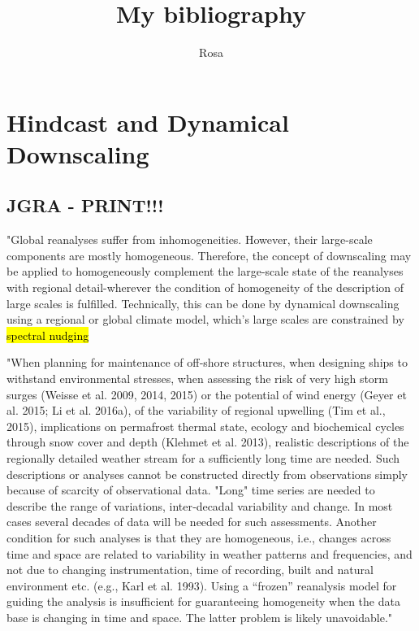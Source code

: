 \documentclass[12pt,a4paper]{article}
\title{My bibliography}
\author{Rosa}
\begin{document}
\maketitle
\tableofcontents

\section{Hindcast and Dynamical Downscaling }

\subsection{\cite{VonStorch2017} JGRA - PRINT!!!}

"Global reanalyses suffer from inhomogeneities. However, their large-scale components are mostly homogeneous. Therefore, the concept of downscaling may be applied to homogeneously complement the large-scale state of the reanalyses with regional detail-wherever the condition of homogeneity of the description of large scales is fulfilled. Technically, this can be done by dynamical downscaling using a regional or global climate model, which's large scales are constrained by \hl{spectral nudging}

"When planning for maintenance of off‐shore structures, when designing ships to withstand environmental stresses, when assessing the risk of very high storm surges (Weisse et al. 2009, 2014, 2015) or the potential of wind energy (Geyer et al. 2015; Li et al. 2016a), of the variability of regional upwelling (Tim et al., 2015), implications on permafrost thermal state, ecology and biochemical cycles through snow cover and depth (Klehmet et al. 2013), realistic descriptions of the regionally detailed weather stream for a sufficiently long time are needed. Such descriptions or analyses cannot be constructed directly from observations simply because of scarcity of observational data. "Long" time series are needed to describe the range of variations, inter‐decadal variability and change. In most cases several decades of data will be needed for such assessments. Another condition for such analyses is that they are homogeneous, i.e., changes across time and space are related to variability in weather patterns and frequencies, and not due to changing instrumentation, time of recording, built and natural environment etc. (e.g., Karl et al. 1993). Using a “frozen” reanalysis model for guiding the analysis is insufficient for guaranteeing homogeneity when the data base is changing in time and space. The latter problem is likely unavoidable."
\end{document}
